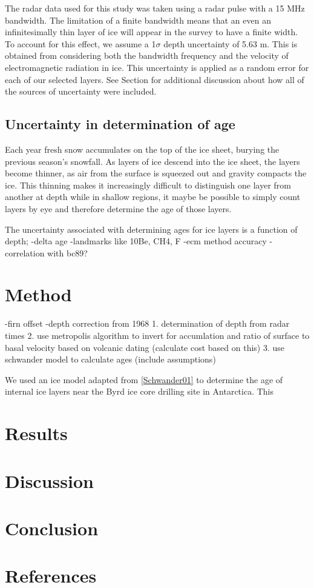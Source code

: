 \documentclass[draft,jgrga]{agutex}
\begin{document}
The radar data used for this study was taken using a radar pulse with
a 15 MHz bandwidth. The limitation of a finite bandwidth means that
an even an infinitesimally thin layer of ice will appear in the survey
to have a finite width. To account for this effect, we assume a
1$\sigma$ depth uncertainty of 5.63 m. This is obtained from considering both
the bandwidth frequency and the velocity of electromagnetic radiation
in ice. This uncertainty is applied as a random error for each of our selected
layers. See Section \label{method} for additional discussion about how
all of the sources of uncertainty were included.



\subsection{Uncertainty in determination of age}

Each year fresh snow accumulates on the top of the ice sheet,
burying the previous season's snowfall. As layers of ice descend into
the ice sheet, the layers become thinner, as air from the surface is
squeezed out and gravity compacts the ice. This thinning makes it
increasingly difficult to distinguish one layer from another at
depth while in shallow regions, it maybe be possible to simply count
layers by eye and therefore determine the age of those layers. 

The uncertainty associated with determining ages for ice layers is a
function of depth;
-delta age
-landmarks like 10Be, CH4, F
-ecm method accuracy
-correlation with bc89?

\section{Method}
-firn offset
-depth correction from 1968 
1. determination of depth from radar times
2. use metropolis algorithm to invert for accumlation and ratio of
surface to basal velocity based on volcanic dating (calculate cost
based on this)
3. use schwander model to calculate ages (include assumptions)


We used an ice model adapted from \ref{Schwander01} to determine the
age of internal ice layers near the Byrd ice core drilling site in
Antarctica. This 


\section{Results}

\section{Discussion}

\section{Conclusion}

\section{References}
\end{document}
